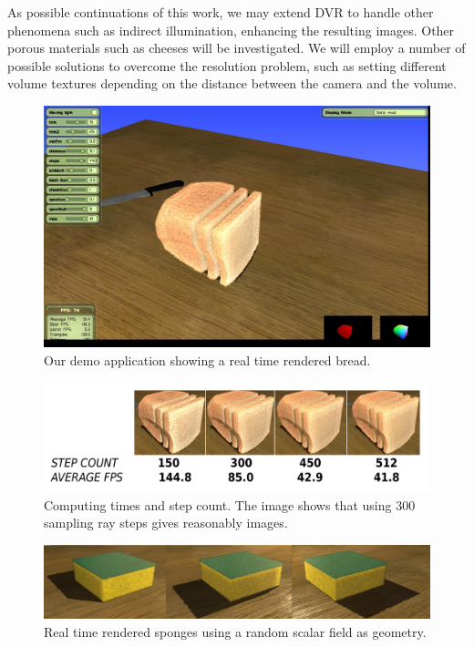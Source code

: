As possible continuations of this work, we may extend DVR to handle other phenomena such as indirect illumination, enhancing the resulting images.
Other porous materials such as cheeses will be investigated.
We will employ a number of possible solutions to overcome the resolution problem, such as setting different volume textures depending on the distance between the camera and the volume. 



\begin{figure}
  \centerline{\includegraphics[width=13cm]{figures/application}}
  \caption{Our demo application showing a real time rendered bread.}
  \label{fg:application}
\end{figure}

\begin{figure}
  \centerline{\includegraphics[width=13cm]{figures/stepcount}}
  \caption{Computing times and step count. The image shows that using $300$ sampling ray steps gives reasonably images. }
  \label{fg:stepcount}
\end{figure}

\begin{figure}
  \centerline{\includegraphics[width=13cm]{figures/sponges}}
  \caption{Real time rendered sponges using a random scalar field as geometry.}
  \label{fg:sponges}
\end{figure}

